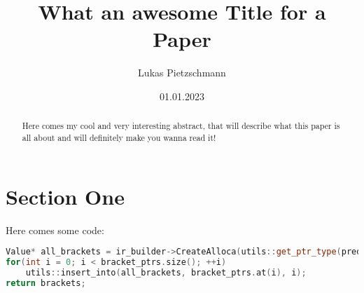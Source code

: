 \documentclass[english]{article}
\title{What an awesome Title for a Paper}
\author{Lukas Pietzschmann}
\date{01.01.2023}
\begin{document}
\maketitle

\begin{abstract}
Here comes my cool and very interesting abstract, that will describe what this paper is all about
and will definitely make you wanna read it!
\end{abstract}

\tableofcontents

\emptypage

\section{Section One}

\par
Here comes some code:

\begin{lstlisting}[language=c++, caption=Ooof what a nice peace of code]
Value* all_brackets = ir_builder->CreateAlloca(utils::get_ptr_type(predef_structures::bracket()), utils::get_integer_constant(bracket_ptrs.size()));
for(int i = 0; i < bracket_ptrs.size(); ++i)
	utils::insert_into(all_brackets, bracket_ptrs.at(i), i);
return brackets;
\end{lstlisting}

\begin{appendix}
\lstlistoflistings
\end{appendix}
\end{document}
